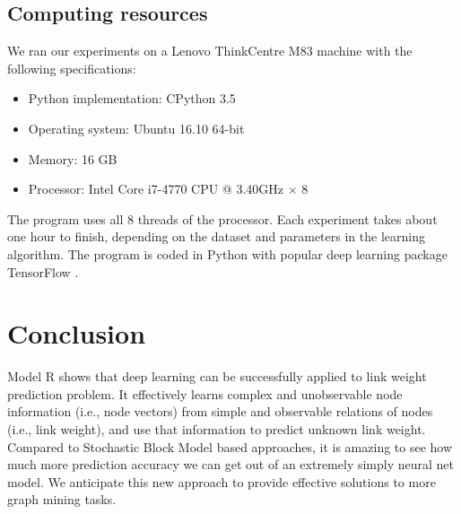 \documentclass[conference]{IEEEtran}
\begin{document}
\subsection{Computing resources}
We ran our experiments on a Lenovo ThinkCentre M83 machine with the following specifications:
\begin{itemize}
	\item Python implementation: CPython 3.5
	\item Operating system: Ubuntu 16.10 64-bit
	\item Memory: 16 GB
	\item Processor: Intel Core i7-4770 CPU @ 3.40GHz $ \times $ 8
\end{itemize}
The program uses all 8 threads of the processor.
Each experiment takes about one hour to finish,
depending on the dataset and parameters in the learning algorithm.
The program is coded in Python
with popular deep learning package TensorFlow \cite{abadi2016tensorflow}.

\section{Conclusion}
Model R shows that deep learning can be successfully applied to link weight prediction problem.
It effectively learns complex and unobservable node information (i.e., node vectors) from simple and observable relations of nodes (i.e., link weight),
and use that information to predict unknown link weight.
Compared to Stochastic Block Model based approaches,
it is amazing to see how much more prediction accuracy we can get out of
an extremely simply neural net model.
We anticipate this new approach to provide effective solutions to more
graph mining tasks.



\end{document}
